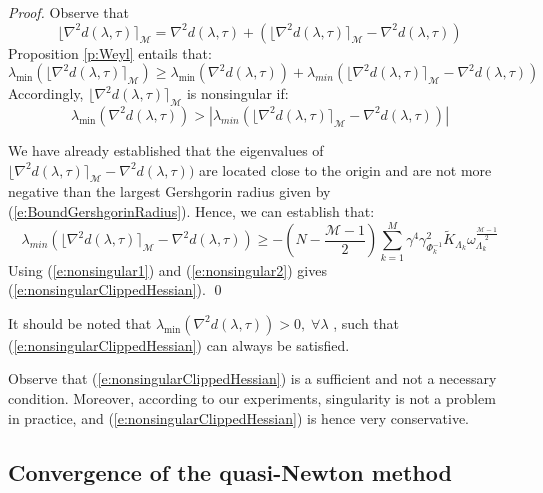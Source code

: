 \begin{proof}
Observe that
\begin{equation}
\lfloor \nabla^2 d(\lambda, \tau) \rceil_{\mathcal{M}} = \nabla^2 d(\lambda, \tau) + \left( \lfloor \nabla^2 d(\lambda, \tau) \rceil_{\mathcal{M}} - \nabla^2 d(\lambda,\tau) \right)
\end{equation}
Proposition \ref{p:Weyl} entails that:
\begin{equation}
\lambda_{\min} (\lfloor \nabla^2 d(\lambda, \tau) \rceil_{\mathcal{M}}) \geq \lambda_{\min}(\nabla^2 d(\lambda,\tau)) + \lambda_{min} (\lfloor \nabla^2 d(\lambda, \tau) \rceil_{\mathcal{M}} - \nabla^2 d(\lambda,\tau))
\end{equation}
Accordingly, $\lfloor \nabla^2 d(\lambda, \tau) \rceil_{\mathcal{M}}$ is nonsingular if:
\begin{equation} \label{e:nonsingular1}
\lambda_{\min}(\nabla^2 d(\lambda,\tau)) >  | \lambda_{min} (\lfloor \nabla^2 d(\lambda, \tau) \rceil_{\mathcal{M}} - \nabla^2 d(\lambda,\tau)) |
\end{equation}

We have already established that the eigenvalues of $\lfloor \nabla^2 d(\lambda, \tau) \rceil_{\mathcal{M}} - \nabla^2 d(\lambda,\tau))$ are located close to the origin and are not more negative than the largest Gershgorin radius given by (\ref{e:BoundGershgorinRadius}). Hence, we can establish that: 
\begin{equation} \label{e:nonsingular2}
\lambda_{min} (\lfloor \nabla^2 d(\lambda, \tau) \rceil_{\mathcal{M}} - \nabla^2 d(\lambda,\tau)) \geq -\left( N -\frac{\mathcal{M} - 1}{2} \right) \sum_{k=1}^M \gamma^4 \gamma_{\Phi_k^{-1}}^2 \tilde{K}_{\Lambda_k} \omega_{\Lambda_k}^{\frac{\mathcal{M} - 1}{2}}
\end{equation}
Using (\ref{e:nonsingular1}) and (\ref{e:nonsingular2}) gives (\ref{e:nonsingularClippedHessian}).
\qed
\end{proof}
\begin{remark}
It should be noted that $\lambda_{\min}(\nabla^2 d(\lambda,\tau)) > 0, \; \forall \lambda$ \cite{Klintberg2014}, such that (\ref{e:nonsingularClippedHessian}) can always be satisfied.
\end{remark}
Observe that (\ref{e:nonsingularClippedHessian}) is a sufficient and not a necessary condition. Moreover, according to our experiments, singularity is not a problem in practice, and (\ref{e:nonsingularClippedHessian}) is hence very conservative.

\subsection{Convergence of the quasi-Newton method} \label{s:quasiNewton}

